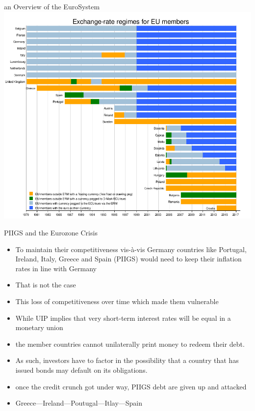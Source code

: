 \documentclass[10pt,hyperref={CJKbookmarks=true},xcolor=dvipsnames,aspectratio=169]{beamer}
\begin{document}
\begin{frame}{an Overview of the EuroSystem}
		\centering
\includegraphics[scale=0.35]{fig/euro/eumember}
\end{frame}

\begin{frame}{PIIGS and the Eurozone Crisis}
	\begin{itemize}
		\item To maintain
		their competitiveness vis-à-vis Germany countries like Portugal, Ireland, Italy, Greece
		and Spain (PIIGS) would need to keep their inflation rates in line with Germany
		\item That is not the case
		\item This loss of competitiveness over time which made them vulnerable
		\item While UIP implies that very short-term interest rates will be equal in a monetary union
		\item the member countries cannot unilaterally	print money to redeem their debt. 
		\item As such, investors have to factor in the possibility that a country that has issued bonds may default on its obligations.
		\item  once the credit crunch got under way, PIIGS debt are given up and attacked
		\item Greece---Ireland---Poutugal---Itlay---Spain
	\end{itemize}
\end{frame}
\end{document}

